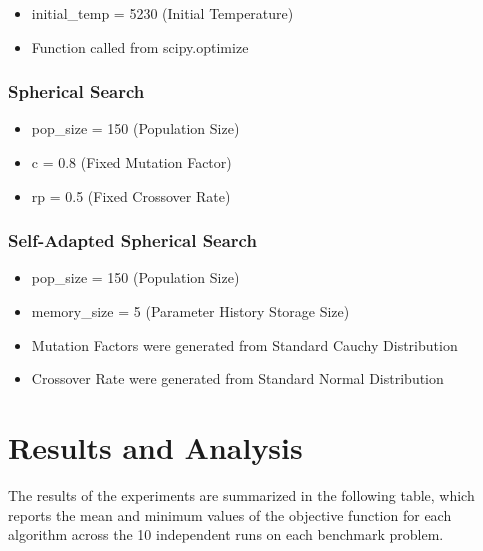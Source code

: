 \documentclass{article}
\begin{document}
\begin{itemize}
    \item initial\_temp = 5230 (Initial Temperature)
    \item Function called from scipy.optimize
\end{itemize}

\subsubsection*{Spherical Search}

\begin{itemize}
    \item pop\_size = 150 (Population Size)
    \item c = 0.8 (Fixed Mutation Factor)
    \item rp = 0.5 (Fixed Crossover Rate)
\end{itemize}

\subsubsection*{Self-Adapted Spherical Search}

\begin{itemize}
    \item pop\_size = 150 (Population Size)
    \item memory\_size = 5 (Parameter History Storage Size)
    \item Mutation Factors were generated from Standard Cauchy Distribution
    \item Crossover Rate were generated from Standard Normal Distribution
\end{itemize}

\section{Results and Analysis}

The results of the experiments are summarized in the following table, which reports the mean and minimum values of the objective function for each algorithm across the 10 independent runs on each benchmark problem.
\end{document}
